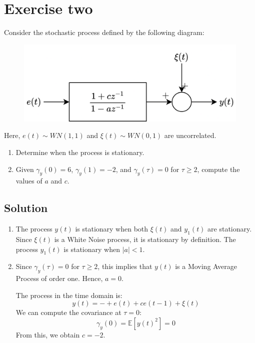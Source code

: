 \section{Exercise two}

Consider the stochastic process defined by the following diagram:
\begin{figure}[H]
    \centering
    \includegraphics[width=0.5\linewidth]{images/block1.png}
\end{figure}
Here, $e(t) \sim WN(1,1)$ and $\xi(t) \sim WN(0,1)$ are uncorrelated.
\begin{enumerate}
    \item Determine when the process is stationary.
    \item Given $\gamma_y(0)=6$, $\gamma_y(1)=-2$, and $\gamma_y(\tau)=0$ for $\tau \geq 2$, compute the values of $a$ and $c$.
\end{enumerate}

\subsection*{Solution}
\begin{enumerate}
    \item The process $y(t)$ is stationary when both $\xi(t)$ and $y_1(t)$ are stationary.
        Since $\xi(t)$ is a White Noise process, it is stationary by definition.
        The process $y_1(t)$ is stationary when $\left\lvert a \right\rvert<1$.
    \item Since $\gamma_y(\tau)=0$ for $\tau \geq 2$, this implies that $y(t)$ is a Moving Average Process of order one.
        Hence, $a=0$.

        The process in the time domain is: 
        \[y(t)=-+e(t)+ce(t-1)+\xi(t)\]
        We can compute the covariance at $\tau=0$:
        \[\gamma_y(0)=\mathbb{E}\left[ y(t)^2 \right]=0\]
        From this, we obtain $c=-2$. 
\end{enumerate}
